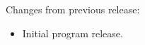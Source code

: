 \documentclass[11pt,titlepage,twoside]{article}
\begin{document}
\noindent
Changes from previous release:
\begin{itemize}
\item Initial program release.
\end{itemize}




\end{document}
